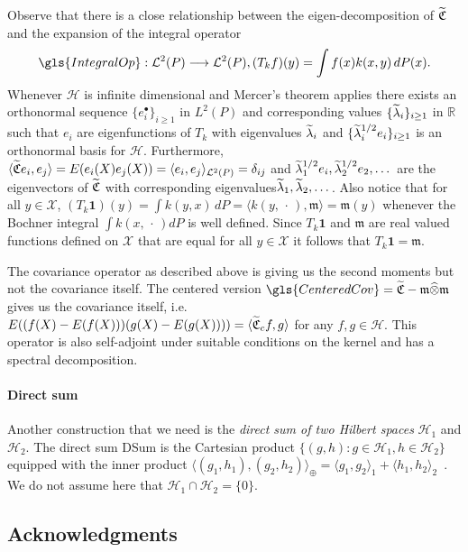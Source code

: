 \documentclass[10pt]{amsart}
\theoremstyle{definition}\newtheorem{defi}[theo]{Definition}\newtheorem{rema}[theo]{Remark}\newtheorem{exam}[theo]{Example}\newtheorem{exem}[theo]{Example}\newtheorem{nota}[theo]{Notation}
\theoremstyle{remark}
\newcommand{\R}{\mathbb{R}}
\newcommand{\X}{\mathcal{X}}
\newcommand{\cH}{\mathcal{H}}
\newcommand{\clL}{\mathcal{L}}
\newcommand{\fkC}{\mathfrak{C}}
\newcommand{\mean}{\mathfrak{m}}
\let\oldtilde\tilde
\renewcommand*{\tilde}[1]{\mathchoice{\widetilde{#1}}{\widetilde{#1}}{\oldtilde{#1}}{\oldtilde{#1}}}
\renewcommand*{\to}{\mathchoice{\longrightarrow}{\rightarrow}{\rightarrow}{\rightarrow}}
\begin{document}
Observe that there is a close relationship between the eigen-decomposition of $\tilde{\fkC}$ and the expansion of the integral operator
\[
\gls{IntegralOp}: \clL^2(P) \to \clL^2(P), (T_k f)(y) = \int f(x) k(x,y) \, dP(x).
\]
Whenever $\cH$ is infinite dimensional and Mercer's theorem applies there exists an orthonormal sequence $\{e_i^\bullet\}_{i \geq 1}$ in $L^2(P)$ and corresponding values $\{\tilde \lambda_i\}_{i \geq 1}$ in $\R$ such that $e_i$ are eigenfunctions of $T_k$ with eigenvalues $\tilde \lambda_i$ and $\{\tilde \lambda_i^{1/2} e_i\}_{i\geq 1}$ is an orthonormal basis for $\cH$. Furthermore, $\langle \tilde{\fkC} e_i, e_j \rangle = E(e_i(X) e_j(X)) = \langle e_i, e_j \rangle_{\clL^2(P)} = \delta_{ij}$ and $\tilde \lambda_1^{1/2} e_i, \tilde \lambda_2^{1/2} e_2, \dots$ are the eigenvectors of $\tilde{\fkC}$ with corresponding eigenvalues\linebreak $\tilde \lambda_1, \tilde \lambda_2, \dots$. Also notice that for all $y\in \X$, $(T_k\bm 1)(y) = \int k(y,x) \, dP = \langle k(y,\,\cdot\,), \mean \rangle = \mean(y)$ whenever the Bochner integral $\int k(x,\,\cdot\,) dP$ is well defined. Since $T_k \bm 1$ and $\mean$ are real valued functions defined on $\X$ that are equal for all $y \in \X$ it follows that $T_k \bm 1 = \mean$.

The covariance operator as described above is giving us the second moments but not the covariance itself. The centered version $ \gls{CenteredCov}= \tilde{\fkC} - \mean \widehat{\otimes} \mean$ gives us the covariance itself, i.e. $E((f(X) - E(f(X)))(g(X) - E(g(X)))) = \langle \tilde{\fkC}_c f,g \rangle$ for any $f,g \in \cH$. This operator is also self-adjoint under suitable conditions on the kernel and has a spectral decomposition.


\paragraph{Direct sum}

Another construction that we need is the \emph{direct sum of two Hilbert spaces} $\cH_1$ and $\cH_2$. The direct sum
\gls{DSum} is the Cartesian product $\{(g,h) : g \in \cH_1, h\in \cH_2\}$ equipped with the inner product $\langle (g_1,h_1), (g_2,h_2) \rangle_{\oplus} = \langle g_1, g_2\rangle_1 + \langle h_1, h_2 \rangle_2$~\cite[p.~40, Example~5]{REED72}. We do not assume here that $\cH_1 \cap \cH_2 = \{0\}$.

\subsection*{Acknowledgments}
\end{document}
